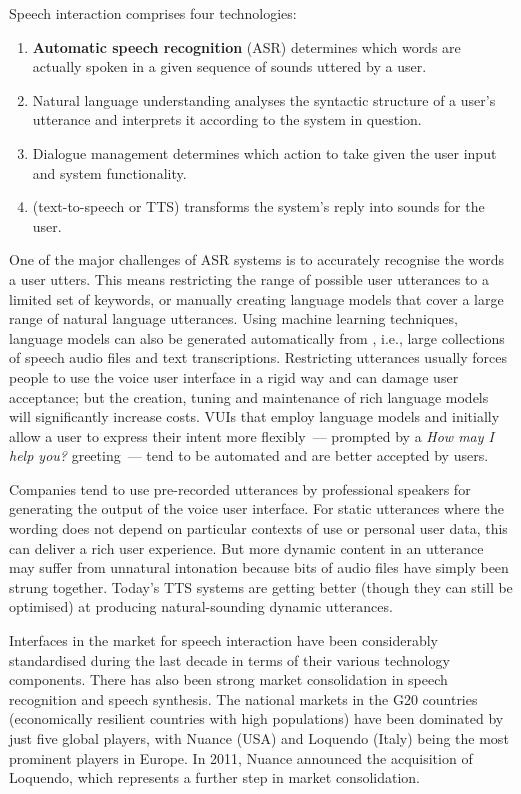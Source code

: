 \begin{multicols}{2}
Speech interaction comprises four technologies: 
\begin{enumerate}
\item \textbf{Automatic speech recognition} (ASR) determines which words are actually spoken in a given sequence of sounds uttered by a user.  
\item Natural language understanding analyses the syntactic structure of a user's utterance and interprets it according to the system in question.  
\item Dialogue management determines which action to take given the user input and system functionality.
\item {} (text-to-speech or TTS) transforms the system's reply into sounds for the user. 
\end{enumerate}

One of the major challenges of ASR systems is to accurately recognise the words a user utters.
This means restricting the range of possible user utterances to a limited set of keywords, or manually creating language models that cover a large range of natural language utterances.
Using machine learning techniques, language models can also be generated automatically from , i.e., large collections of speech audio files and text transcriptions.
Restricting utterances usually forces people to use the voice user interface in a rigid way and can damage user acceptance; but the creation, tuning and maintenance of rich language models will significantly increase costs.
VUIs that employ language models and initially allow a user to express their intent more flexibly~--- prompted by a \textit{How may I help you?} greeting~--- tend to be automated and are better accepted by users. 

Companies tend to use pre-recorded utterances by professional speakers for generating the output of the voice user interface.
For static utterances where the wording does not depend on particular contexts of use or personal user data, this can deliver a rich user experience.
But more dynamic content in an utterance may suffer from unnatural intonation because bits of audio files have simply been strung together.
Today's TTS systems are getting better (though they can still be optimised) at producing natural-sounding dynamic utterances.  

Interfaces in the market for speech interaction have been considerably standardised during the last decade in terms of their various technology components.
There has also been strong market consolidation in speech recognition and speech synthesis.
The national markets in the G20 countries (economically resilient countries with high populations) have been dominated by just five global players, with Nuance (USA) and Loquendo (Italy) being the most prominent players in Europe.
In 2011, Nuance announced the acquisition of Loquendo, which represents a further step in market consolidation.


\end{multicols}
